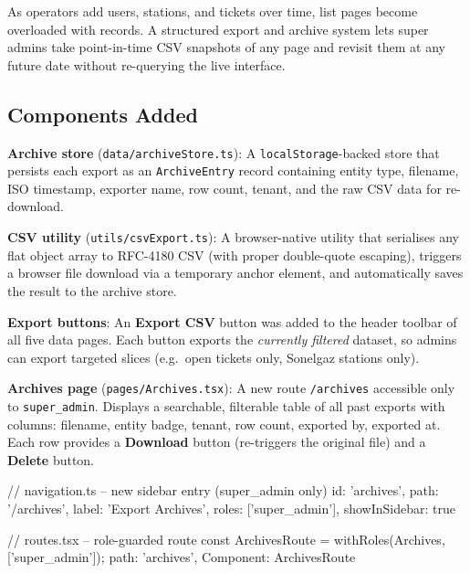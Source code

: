 \documentclass[12pt,a4paper]{report}
\newcommand{\file}[1]{\texttt{\small #1}}
\begin{document}
	As operators add users, stations, and tickets over time, list pages become
	overloaded with records. A structured export and archive system lets super
	admins take point-in-time CSV snapshots of any page and revisit them at any
	future date without re-querying the live interface.

	\subsection*{Components Added}

	\textbf{Archive store} (\file{data/archiveStore.ts}): A \texttt{localStorage}-backed
	store that persists each export as an \texttt{ArchiveEntry} record containing
	entity type, filename, ISO timestamp, exporter name, row count, tenant, and
	the raw CSV data for re-download.

	\textbf{CSV utility} (\file{utils/csvExport.ts}): A browser-native utility that
	serialises any flat object array to RFC-4180 CSV (with proper double-quote
	escaping), triggers a browser file download via a temporary anchor element,
	and automatically saves the result to the archive store.


	\textbf{Export buttons}: An \textbf{Export CSV} button was added to the header
	toolbar of all five data pages. Each button exports the \emph{currently filtered}
	dataset, so admins can export targeted slices (e.g.\ open tickets only, Sonelgaz
	stations only).

	\textbf{Archives page} (\file{pages/Archives.tsx}): A new route \texttt{/archives}
	accessible only to \texttt{super\_admin}. Displays a searchable, filterable table
	of all past exports with columns: filename, entity badge, tenant, row count,
	exported by, exported at. Each row provides a \textbf{Download} button
	(re-triggers the original file) and a \textbf{Delete} button.

	\begin{codebox}
// navigation.ts -- new sidebar entry (super_admin only)
{ id: 'archives', path: '/archives',
  label: 'Export Archives',
  roles: ['super_admin'], showInSidebar: true }

// routes.tsx -- role-guarded route
const ArchivesRoute = withRoles(Archives, ['super_admin']);
{ path: 'archives', Component: ArchivesRoute }
	\end{codebox}
\end{document}
